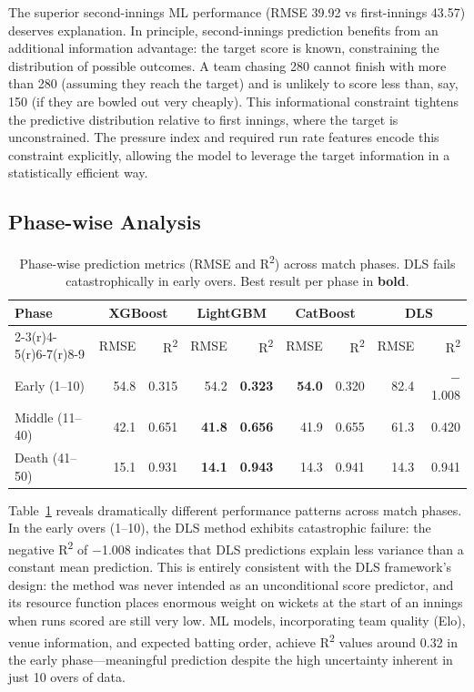 \documentclass[10pt,a4paper,twocolumn]{article}
\begin{document}
The superior second-innings ML performance (RMSE 39.92 vs first-innings 43.57) deserves explanation. In principle, second-innings prediction benefits from an additional information advantage: the target score is known, constraining the distribution of possible outcomes. A team chasing 280 cannot finish with more than 280 (assuming they reach the target) and is unlikely to score less than, say, 150 (if they are bowled out very cheaply). This informational constraint tightens the predictive distribution relative to first innings, where the target is unconstrained. The pressure index and required run rate features encode this constraint explicitly, allowing the model to leverage the target information in a statistically efficient way.

\subsection{Phase-wise Analysis}

\begin{table}[t]
\centering
\caption{Phase-wise prediction metrics (RMSE and R\textsuperscript{2}) across match phases. DLS fails catastrophically in early overs. Best result per phase in \textbf{bold}.}
\label{tab:phase}
\begin{tabular}{@{}lrrrrrrrr@{}}
\toprule
\textbf{Phase} & \multicolumn{2}{c}{\textbf{XGBoost}} & \multicolumn{2}{c}{\textbf{LightGBM}} & \multicolumn{2}{c}{\textbf{CatBoost}} & \multicolumn{2}{c}{\textbf{DLS}} \\
\cmidrule(r){2-3}\cmidrule(r){4-5}\cmidrule(r){6-7}\cmidrule(r){8-9}
& RMSE & R\textsuperscript{2} & RMSE & R\textsuperscript{2} & RMSE & R\textsuperscript{2} & RMSE & R\textsuperscript{2} \\
\midrule
Early (1--10)  & 54.8 & 0.315 & 54.2 & \textbf{0.323} & \textbf{54.0} & 0.320 & 82.4 & $-$1.008 \\
Middle (11--40) & 42.1 & 0.651 & \textbf{41.8} & \textbf{0.656} & 41.9 & 0.655 & 61.3 & 0.420 \\
Death (41--50) & 15.1 & 0.931 & \textbf{14.1} & \textbf{0.943} & 14.3 & 0.941 & 14.3 & 0.941 \\
\bottomrule
\end{tabular}
\end{table}

Table~\ref{tab:phase} reveals dramatically different performance patterns across match phases. In the early overs (1--10), the DLS method exhibits catastrophic failure: the negative R\textsuperscript{2} of $-$1.008 indicates that DLS predictions explain less variance than a constant mean prediction. This is entirely consistent with the DLS framework's design: the method was never intended as an unconditional score predictor, and its resource function places enormous weight on wickets at the start of an innings when runs scored are still very low. ML models, incorporating team quality (Elo), venue information, and expected batting order, achieve R\textsuperscript{2} values around 0.32 in the early phase---meaningful prediction despite the high uncertainty inherent in just 10 overs of data.
\end{document}
